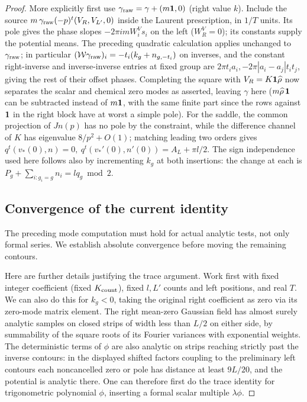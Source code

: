 \begin{proof}
More explicitly first use \(\gamma_{\rm raw}=\gamma+(m{\bf1},0)\) (right value \(k\)). Include the source \(m\,\gamma_{\rm raw}(-p)^t\allowbreak(V_R,V_{L'},0)\) inside the Laurent prescription, in \(1/T\) units. Its pole gives the phase slopes \(-2\pi i m W^V_i s_i\) on the left (\(W^V_R=0\)); its constants supply the potential means. The preceding quadratic calculation applies unchanged to \(\gamma_{\rm raw}\); in particular \(({\cal W}\gamma_{\rm raw})_i=-t_i(k_g+n_{g,-t_i})\) on inverses, and the constant right-inverse and inverse-inverse entries at fixed group are \(2\pi t_i a_i,-2\pi|a_i-a_j|t_i t_j\), giving the rest of their offset phases. Completing the square with \(V_R=K{\bf1}\widehat\rho\) now separates the scalar and chemical zero modes as asserted, leaving \(\gamma\) here (\(m\widehat\rho\,{\bf1}\) can be subtracted instead of \(m{\bf1}\), with the same finite part since the rows against \({\bf1}\) in the right block have at worst a simple pole). For the saddle, the common projection of \(Jn(p)\) has no pole by the constraint, while the difference channel of \(K\) has eigenvalue \(8/p^2+O(1)\); matching leading two orders gives \(q^t(v_*(0),n)=0,\ q^t(v_*'(0),n'(0))=A_L+\pi l/2\). The sign independence used here follows also by incrementing \(k_g\) at both insertions: the change at each is \(P_g+\sum_{i:g_i=g}n_i=l q_g\bmod 2\).

\subsection{Convergence of the current identity}
The preceding mode computation must hold for actual analytic tests, not only formal series. We establish absolute convergence before moving the remaining contours.

Here are further details justifying the trace argument. Work first with fixed integer coefficient (fixed \(K_{\rm count}\)), fixed \(l,L'\) counts and left positions, and real \(T\). We can also do this for \(k_g<0\), taking the original right coefficient as zero via its zero-mode matrix element. The right mean-zero Gaussian field has almost surely analytic samples on closed strips of width less than \(L/2\) on either side, by summability of the square roots of its Fourier variances with exponential weights. The deterministic terms of \(\phi\) are also analytic on strips reaching strictly past the inverse contours: in the displayed shifted factors coupling to the preliminary left contours each noncancelled zero or pole has distance at least \(9L/20\), and the potential is analytic there. One can therefore first do the trace identity for trigonometric polynomial \(\phi\), inserting a formal scalar multiple \(\lambda\phi\).


\end{proof}
